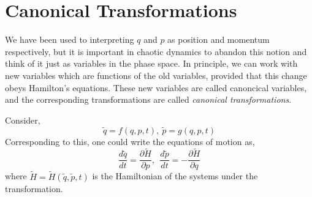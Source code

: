 \section{Canonical Transformations}
We have been used to interpreting $q$ and $p$ as position and momentum respectively, but it is important in chaotic dynamics to abandon this notion and think of it just as variables in the phase space. In principle, we can work with new variables which are functions of the old variables, provided that this change obeys Hamilton's equations. These new variables are called canoncical variables, and the corresponding transformations are called \textit{canonical transformations}.

Consider,
$$\tilde{q} = f(q,p,t), \ \tilde{p}=g(q,p,t)$$
Corresponding to this, one could write the equations of motion as,
$$\frac{d\tilde{q}}{dt} = \frac{\partial \tilde{H}}{\partial p}, \ \ \frac{d\tilde{p}}{dt}=-\frac{\partial \tilde{H}}{\partial q}$$
where $\tilde{H} = \tilde{H}(\tilde{q},\tilde{p},t)$ is the Hamiltonian of the systems under the transformation.

